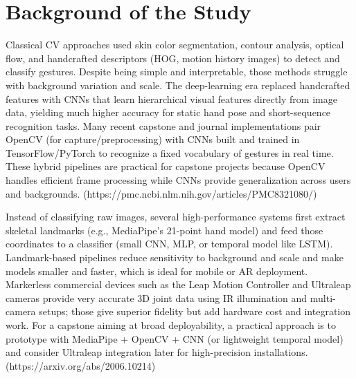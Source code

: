 \section{Background of the Study}

 Classical CV approaches used skin color segmentation, contour analysis, optical flow, and handcrafted descriptors (HOG, motion history images) to detect and classify gestures. Despite being simple and interpretable, those methods struggle with background variation and scale. The deep-learning era replaced handcrafted features with CNNs that learn hierarchical visual features directly from image data, yielding much higher accuracy for static hand pose and short-sequence recognition tasks. Many recent capstone and journal implementations pair OpenCV (for capture/preprocessing) with CNNs built and trained in TensorFlow/PyTorch to recognize a fixed vocabulary of gestures in real time. These hybrid pipelines are practical for capstone projects because OpenCV handles efficient frame processing while CNNs provide generalization across users and backgrounds. (https://pmc.ncbi.nlm.nih.gov/articles/PMC8321080/)

  Instead of classifying raw images, several high-performance systems first extract skeletal landmarks (e.g., MediaPipe’s 21-point hand model) and feed those coordinates to a classifier (small CNN, MLP, or temporal model like LSTM). Landmark-based pipelines reduce sensitivity to background and scale and make models smaller and faster, which is ideal for mobile or AR deployment. Markerless commercial devices such as the Leap Motion Controller and Ultraleap cameras provide very accurate 3D joint data using IR illumination and multi-camera setups; those give superior fidelity but add hardware cost and integration work. For a capstone aiming at broad deployability, a practical approach is to prototype with MediaPipe + OpenCV + CNN (or lightweight temporal model) and consider Ultraleap integration later for high-precision installations. (https://arxiv.org/abs/2006.10214)

